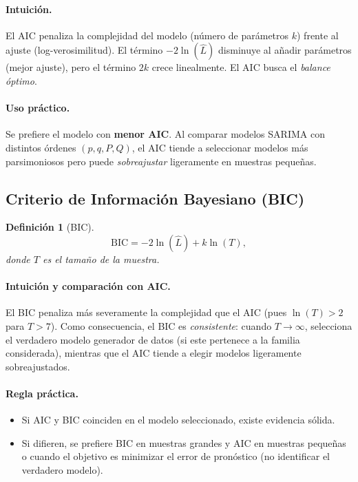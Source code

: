 \documentclass[12pt,a4paper]{article}
\newtheorem{definicion}{Definición}[section]
\begin{document}
\paragraph{Intuición.}
El AIC penaliza la complejidad del modelo (número de parámetros $k$) frente al ajuste
(log-verosimilitud). El término $-2\ln(\hat{L})$ disminuye al añadir parámetros (mejor ajuste),
pero el término $2k$ crece linealmente. El AIC busca el \textit{balance óptimo}.

\paragraph{Uso práctico.}
Se prefiere el modelo con \textbf{menor AIC}. Al comparar modelos SARIMA con distintos
órdenes $(p,q,P,Q)$, el AIC tiende a seleccionar modelos más parsimoniosos pero puede
\textit{sobreajustar} ligeramente en muestras pequeñas.

\subsection{Criterio de Información Bayesiano (BIC)}

\begin{definicion}[BIC]
\[
  \mathrm{BIC} = -2\ln(\hat{L}) + k\ln(T),
\]
donde $T$ es el tamaño de la muestra.
\end{definicion}

\paragraph{Intuición y comparación con AIC.}
El BIC penaliza más severamente la complejidad que el AIC (pues $\ln(T) > 2$ para $T > 7$).
Como consecuencia, el BIC es \textit{consistente}: cuando $T \to \infty$, selecciona el verdadero
modelo generador de datos (si este pertenece a la familia considerada), mientras que el AIC
tiende a elegir modelos ligeramente sobreajustados.

\paragraph{Regla práctica.}
\begin{itemize}
  \item Si AIC y BIC coinciden en el modelo seleccionado, existe evidencia sólida.
  \item Si difieren, se prefiere BIC en muestras grandes y AIC en muestras pequeñas o cuando
        el objetivo es minimizar el error de pronóstico (no identificar el verdadero modelo).
\end{itemize}
\end{document}
